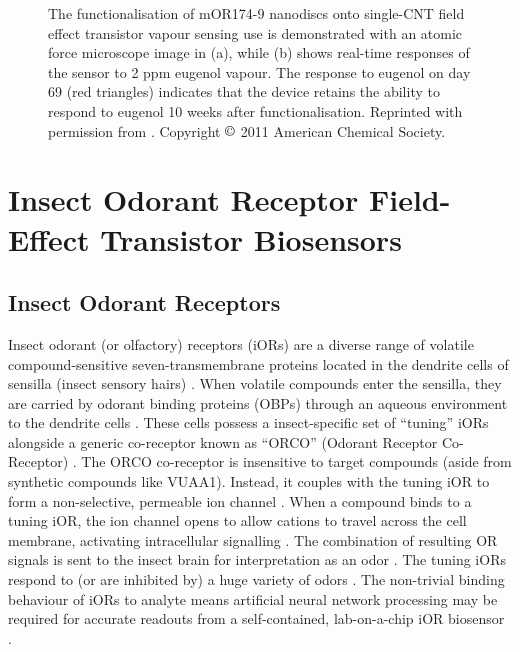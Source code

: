 \documentclass[
  a4paper,
]{scrbook}
\begin{document}
\begin{figure}
\begin{minipage}[t]{0.01\linewidth}
\end{minipage}%

\caption[Functionalisation and sensing behaviour of the nanodisc-based
carbon nanotube field-effect transistor of Goldsmith \emph{et
al.}]{\label{fig-eugenol-responses}The functionalisation of mOR174-9
nanodiscs onto single-CNT field effect transistor vapour sensing use is
demonstrated with an atomic force microscope image in (a), while (b)
shows real-time responses of the sensor to 2 ppm eugenol vapour. The
response to eugenol on day 69 (red triangles) indicates that the device
retains the ability to respond to eugenol 10 weeks after
functionalisation. Reprinted with permission from
\autocite{Goldsmith2011}. Copyright \(\copyright\) 2011 American
Chemical Society.}

\end{figure}

\hypertarget{sec-insect-OR-biosensors}{%
\section{Insect Odorant Receptor Field-Effect Transistor
Biosensors}\label{sec-insect-OR-biosensors}}

\hypertarget{insect-odorant-receptors}{%
\subsection{Insect Odorant Receptors}\label{insect-odorant-receptors}}

Insect odorant (or olfactory) receptors (iORs) are a diverse range of
volatile compound-sensitive seven-transmembrane proteins located in the
dendrite cells of sensilla (insect sensory hairs)
\autocite{Clyne1999,Carraher2015,Brito2016,Wicher2021}. When volatile
compounds enter the sensilla, they are carried by odorant binding
proteins (OBPs) through an aqueous environment to the dendrite cells
\autocite{Carraher2015,Brito2016,Wicher2021}. These cells possess a
insect-specific set of ``tuning'' iORs alongside a generic co-receptor
known as ``ORCO'' (Odorant Receptor Co-Receptor)
\autocite{Carraher2015,Butterwick2018,Khadka2019,Wicher2021}. The ORCO
co-receptor is insensitive to target compounds (aside from synthetic
compounds like VUAA1). Instead, it couples with the tuning iOR to form a
non-selective, permeable ion channel
\autocite{Butterwick2018,Wicher2021}. When a compound binds to a tuning
iOR, the ion channel opens to allow cations to travel across the cell
membrane, activating intracellular signalling
\autocite{Smart2008,Wicher2008,Sato2008,Carraher2015,Brito2016,Butterwick2018,Wicher2021}.
The combination of resulting OR signals is sent to the insect brain for
interpretation as an odor \autocite{Hallem2004,Carraher2015,Wicher2021}.
The tuning iORs respond to (or are inhibited by) a huge variety of odors
\autocite{Munch2016}. The non-trivial binding behaviour of iORs to
analyte means artificial neural network processing may be required for
accurate readouts from a self-contained, lab-on-a-chip iOR biosensor
\autocite{Bachtiar2016}.
\end{document}
